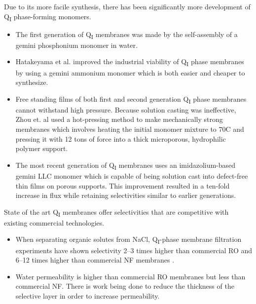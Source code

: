   Due to its more facile synthesis, there has been significantly more development
  of Q\textsubscript{I} phase-forming monomers.
  \begin{itemize}
    \item The first generation of Q\textsubscript{I} membranes was made by 
    the self-assembly of a gemini phosphonium monomer in water.~\cite{pindzola_cross-linked_2003}
    \item Hatakeyama et al. improved the industrial viability of Q\textsubscript{I} 
    phase membranes by using a gemini ammonium monomer which is both easier and cheaper
    to synthesize.~\cite{hatakeyama_nanoporous_2010}
    \item Free standing films of both first and second generation Q\textsubscript{I} phase 
    membranes cannot withstand high pressure. Because solution casting was ineffective, Zhou
    et. al used a hot-pressing method to make mechanically strong membranes which involves 
    heating the initial monomer mixture to 70\degree C and pressing it with 12 tons of force
    into a thick microporous, hydrophilic polymer support.~\cite{zhou_new_2007}
    \item The most recent generation of Q\textsubscript{I} membranes uses an imidazolium-based
    gemini LLC monomer which is capable of being solution cast into defect-free thin films on
    porous supports. This improvement resulted in a ten-fold increase in flux while retaining
    selectivities similar to earlier generations.~\cite{carter_glycerol-based_2012}
  \end{itemize}
  
  
  State of the art Q\textsubscript{I} membranes offer selectivities that
  are competitive with existing commercial technologies.
  \begin{itemize}
    \item When separating organic solutes from NaCl, Q\textsubscript{I}-phase
    membrane filtration experiments have shown selectivity 2--3 times higher than
    commercial RO and 6--12 times higher than commercial NF membranes
    \cite{dischinger_application_2017}.
    \item Water permeability is higher than commercial RO membranes but
    less than commercial NF. There is work being done to reduce the
    thickness of the selective layer in order to increase permeability. 
  \end{itemize}


